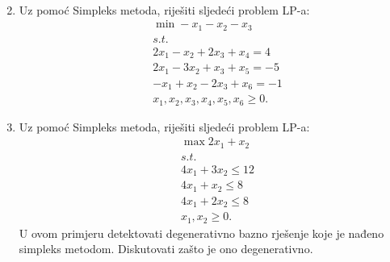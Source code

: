 \documentclass[a4paper, utf8, 11pt, colorlinks]{book}
\begin{document}
\begin{enumerate}
\begin{align*}
   \end{align*}
\item  Uz pomoć Simpleks metoda, riješiti sljedeći problem LP-a:%
\begin{align*}
    & \min -x_1 - x_2 - x_3 \\
    & s.t. \\
    & 2 x_1 - x_2 + 2 x_3 + x_4 = 4 \\
    & 2x_1 - 3x_2 + x_3 + x_5 =  -5 \\
    & -x_1 + x_2 - 2x_3 + x_6 = -1 \\
    & x_1, x_2, x_3, x_4, x_5, x_6 \geq 0.	
\end{align*}
\item Uz pomoć Simpleks metoda, riješiti sljedeći problem LP-a:
\begin{align*}
	 &\max 2x_1 + x_2 \\
	 & s.t. \\
	 &4 x_1 + 3 x_2 \leq 12 \\
	 & 4 x_1 + x_2 \leq 8 \\
	 & 4 x_1 + 2 x_2 \leq 8 \\
	 & x_1, x_2 \geq 0.
\end{align*}
U ovom primjeru detektovati degenerativno bazno rješenje koje je nađeno simpleks metodom. Diskutovati zašto je ono degenerativno. 

\end{enumerate}
\end{document}
